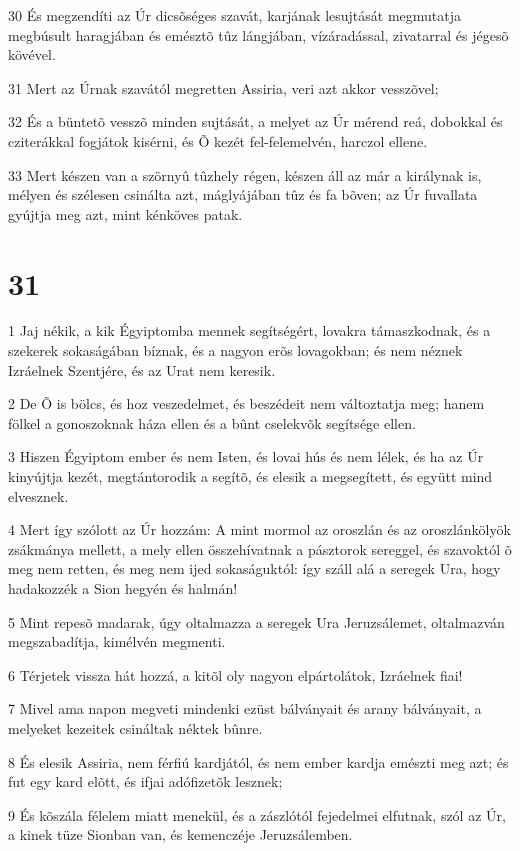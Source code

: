 \par 30 És megzendíti az Úr dicsõséges szavát, karjának lesujtását megmutatja megbúsult haragjában és emésztõ tûz lángjában, vízáradással, zivatarral és jégesõ kövével.
\par 31 Mert az Úrnak szavától megretten Assiria, veri azt akkor vesszõvel;
\par 32 És a büntetõ vesszõ minden sujtását, a melyet az Úr mérend reá, dobokkal és cziterákkal fogjátok kisérni, és Õ kezét fel-felemelvén, harczol ellene.
\par 33 Mert készen van a szörnyû tûzhely régen, készen áll az már a királynak is, mélyen és szélesen csinálta azt, máglyájában tûz és fa bõven; az Úr fuvallata gyújtja meg azt, mint kénköves patak.

\chapter{31}

\par 1 Jaj nékik, a kik Égyiptomba mennek segítségért, lovakra támaszkodnak, és a szekerek sokaságában bíznak, és a nagyon erõs lovagokban; és nem néznek Izráelnek Szentjére, és az Urat nem keresik.
\par 2 De Õ is bölcs, és hoz veszedelmet, és beszédeit nem változtatja meg; hanem fölkel a gonoszoknak háza ellen és a bûnt cselekvõk segítsége ellen.
\par 3 Hiszen Égyiptom ember és nem Isten, és lovai hús és nem lélek, és ha az Úr kinyújtja kezét, megtántorodik a segítõ, és elesik a megsegített, és együtt mind elvesznek.
\par 4 Mert így szólott az Úr hozzám: A mint mormol az oroszlán és az oroszlánkölyök zsákmánya mellett, a mely ellen összehívatnak a pásztorok sereggel, és szavoktól õ meg nem retten, és meg nem ijed sokaságuktól: így száll alá a seregek Ura, hogy hadakozzék a Sion hegyén és halmán!
\par 5 Mint repesõ madarak, úgy oltalmazza a seregek Ura Jeruzsálemet, oltalmazván megszabadítja, kimélvén megmenti.
\par 6 Térjetek vissza hát hozzá, a kitõl oly nagyon elpártolátok, Izráelnek fiai!
\par 7 Mivel ama napon megveti mindenki ezüst bálványait és arany bálványait, a melyeket kezeitek csináltak néktek bûnre.
\par 8 És elesik Assiria, nem férfiú kardjától, és nem ember kardja emészti meg azt; és fut egy kard elõtt, és ifjai adófizetõk lesznek;
\par 9 És kõszála félelem miatt menekül, és a zászlótól fejedelmei elfutnak, szól az Úr, a kinek tüze Sionban van, és kemenczéje Jeruzsálemben.

